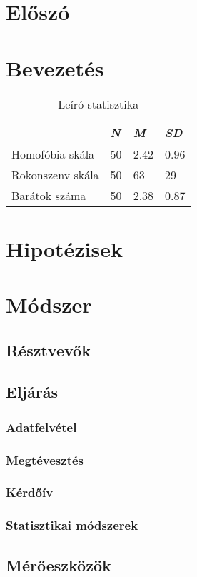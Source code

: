 \section{Előszó}
\section{Bevezetés}
\begin{table}[]
	\centering
	\begin{tabular}{|l|l|l|l|}
		\hline
		& \textit{N}  & \textit{M}    & \textit{SD}   \\ \hline
		Homofóbia skála  & 50 & 2.42 & 0.96 \\ \hline
		Rokonszenv skála & 50 & 63   & 29   \\ \hline
		Barátok száma    & 50 & 2.38 & 0.87 \\ \hline
	\end{tabular}
	\caption{Leíró statisztika}
	\label{table:1}
\end{table}
\pagebreak
\section{Hipotézisek}
\section{Módszer}
\subsection{Résztvevők}
\subsection{Eljárás}
\subsubsection{Adatfelvétel}
\subsubsection{Megtévesztés}
\subsubsection{Kérdőív}
\subsubsection{Statisztikai módszerek}
\subsection{Mérőeszközök}
